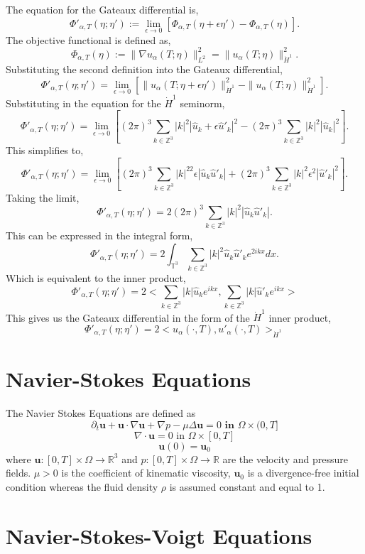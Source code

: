 \documentclass[12pt]{article}
\begin{document}
\begin{flushleft}
The equation for the Gateaux differential is,
$$\Phi'_{\alpha,T}(\eta;\eta'):=\lim_{\epsilon\rightarrow 0}[\Phi_{\alpha,T}(\eta+\epsilon\eta')-\Phi_{\alpha,T}(\eta)].$$
The objective functional is defined as,
$$\Phi_{\alpha,T}(\eta):=\|\nabla u_\alpha(T;\eta)\|_{L^2}^2 = \|u_\alpha(T;\eta)\|_{\dot{H}^1}^2.$$
Substituting the second definition into the Gateaux differential,
$$\Phi'_{\alpha,T}(\eta;\eta')=\lim_{\epsilon\rightarrow 0}[\|u_\alpha(T;\eta+\epsilon\eta')\|_{\dot{H}^1}^2-\|u_\alpha(T;\eta)\|_{\dot{H}^1}^2].$$
Substituting in the equation for the $\dot{H}^1$ seminorm,
$$\Phi'_{\alpha,T}(\eta;\eta')=\lim_{\epsilon\rightarrow 0}[(2\pi)^3\sum_{k\in\mathbb{Z}^3}|k|^2|\hat{u}_k+\epsilon\hat{u}'_k|^2-(2\pi)^3\sum_{k\in\mathbb{Z}^3}|k|^2|\hat{u}_k|^2].$$
This simplifies to,
$$\Phi'_{\alpha,T}(\eta;\eta')=\lim_{\epsilon\rightarrow 0}[(2\pi)^3\sum_{k\in\mathbb{Z}^3}|k|^22\epsilon|\hat{u}_k\hat{u}'_k|+(2\pi)^3\sum_{k\in\mathbb{Z}^3}|k|^2\epsilon^2|\hat{u}'_k|^2].$$
Taking the limit,
$$\Phi'_{\alpha,T}(\eta;\eta')=2(2\pi)^3\sum_{k\in\mathbb{Z}^3}|k|^2|\hat{u}_k\hat{u}'_k|.$$
This can be expressed in the integral form, 
$$\Phi'_{\alpha,T}(\eta;\eta')=2\int_{\mathbb{T}^3}\sum_{k\in\mathbb{Z}^3}|k|^2\hat{u}_k\hat{u}'_ke^{2ikx}dx.$$
Which is equivalent to the inner product,
$$\Phi'_{\alpha,T}(\eta;\eta')=2<\sum_{k\in\mathbb{Z}^3}|k|\hat{u}_ke^{ikx},\sum_{k\in\mathbb{Z}^3}|k|\hat{u}'_ke^{ikx}>$$
This gives us the Gateaux differential in the form of the $\dot{H}^1$ inner product,
$$\Phi'_{\alpha,T}(\eta;\eta')=  2<u_\alpha(\cdot,T),u'_\alpha(\cdot,T)>_{\dot{H}^1}$$

 
\section{Navier-Stokes Equations}

The Navier Stokes Equations are defined as
$$\partial_t\textbf{u}+\textbf{u}\cdot \nabla \textbf{u}+\nabla p - \mu \Delta \textbf{u} = 0 \textbf{ in }\Omega\times (0,T]$$
$$\nabla \cdot \textbf{u} = 0 \text{ in }\Omega\times[0,T]$$
$$\textbf{u}(0) = \textbf{u}_0$$
where $\textbf{u}:[0,T]\times\Omega \rightarrow \mathbb{R}^3$ and $p:[0,T]\times\Omega \rightarrow \mathbb{R}$ are the velocity and pressure fields. $\mu >0$ is the coefficient of kinematic viscosity, $\textbf{u}_0$ is a divergence-free initial condition whereas the fluid density $\rho$ is assumed constant and equal to 1.

\section{Navier-Stokes-Voigt Equations} 


\end{flushleft}
\end{document}
